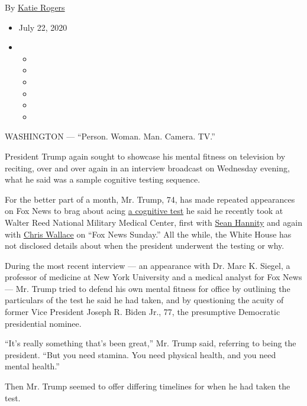 By \href{https://www.nytimes.com/by/katie-rogers}{Katie Rogers}

\begin{itemize}
\item
  July 22, 2020
\item
  \begin{itemize}
  \item
  \item
  \item
  \item
  \item
  \item
  \end{itemize}
\end{itemize}

WASHINGTON --- ``Person. Woman. Man. Camera. TV.''

President Trump again sought to showcase his mental fitness on
television by reciting, over and over again in an interview broadcast on
Wednesday evening, what he said was a sample cognitive testing sequence.

For the better part of a month, Mr. Trump, 74, has made repeated
appearances on Fox News to brag about acing
\href{https://www.nytimes.com/2020/07/10/us/politics/trump-cognitive-test-health.html}{a
cognitive test} he said he recently took at Walter Reed National
Military Medical Center, first with
\href{https://www.nytimes.com/2020/07/10/us/politics/trump-cognitive-test-health.html}{Sean
Hannity} and again with
\href{https://www.nytimes.com/2020/07/19/us/politics/trump-fox-interview-coronavirus-race.html}{Chris
Wallace} on ``Fox News Sunday.'' All the while, the White House has not
disclosed details about when the president underwent the testing or why.

During the most recent interview --- an appearance with Dr. Marc K.
Siegel, a professor of medicine at New York University and a medical
analyst for Fox News --- Mr. Trump tried to defend his own mental
fitness for office by outlining the particulars of the test he said he
had taken, and by questioning the acuity of former Vice President Joseph
R. Biden Jr., 77, the presumptive Democratic presidential nominee.

``It's really something that's been great,'' Mr. Trump said, referring
to being the president. ``But you need stamina. You need physical
health, and you need mental health.''

Then Mr. Trump seemed to offer differing timelines for when he had taken
the test.

